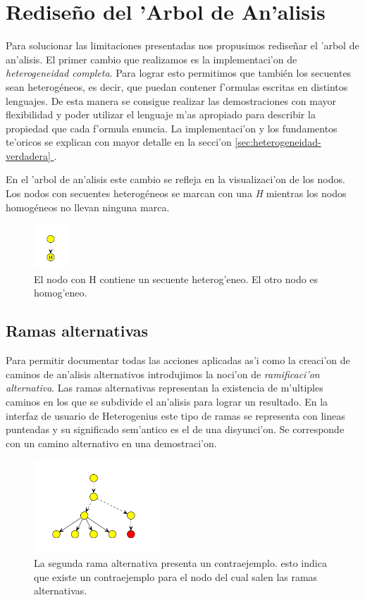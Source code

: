 \section{Rediseño del 'Arbol de An'alisis}

Para solucionar las limitaciones presentadas nos propusimos rediseñar el 'arbol de an'alisis.
El primer cambio que realizamos es la implementaci'on de \emph{heterogeneidad completa}.
Para lograr esto permitimos que también los secuentes sean heterogéneos, es decir, que puedan contener f'ormulas escritas en distintos lenguajes. De esta manera se consigue realizar las demostraciones con mayor flexibilidad y poder utilizar el lenguaje m'as apropiado para describir la propiedad que cada f'ormula enuncia.
La implementaci'on y los fundamentos te'oricos se explican con mayor detalle en la secci'on \hyperref[sec:heterogeneidad-verdadera]{\ref*{sec:heterogeneidad-verdadera} }.

En el 'arbol de an'alisis este cambio se refleja en la visualizaci'on de los nodos. Los nodos con secuentes heterogéneos se marcan con una \textit{H} mientras los nodos homogéneos no llevan ninguna marca.

\begin{figure}[tbh]
	\includegraphics[width=50px]{img/hetero_homo.png}
	\centering
	\caption{El nodo con H contiene un secuente heterog'eneo. El otro nodo es homog'eneo.}
\end{figure}


\subsection{Ramas alternativas}

Para permitir documentar todas las acciones aplicadas as'i como la creaci'on de caminos de an'alisis alternativos introdujimos la noci'on de \textit{ramificaci'on alternativa}.
Las ramas alternativas representan la existencia de m'ultiples caminos en los que se subdivide el an'alisis para lograr un resultado. En la interfaz de usuario de Heterogenius este tipo de ramas se representa con lineas punteadas y su significado sem'antico es el de una disyunci'on. Se corresponde con un camino alternativo en una demostraci'on.

\begin{figure}[htb]
	\includegraphics[width=180px]{img/ramas_alternativas_2.png}
	\centering
	\caption{La segunda rama alternativa presenta un contraejemplo. esto indica que existe un contraejemplo para el nodo del cual salen las ramas alternativas.}
        \label{alter1}
\end{figure}

